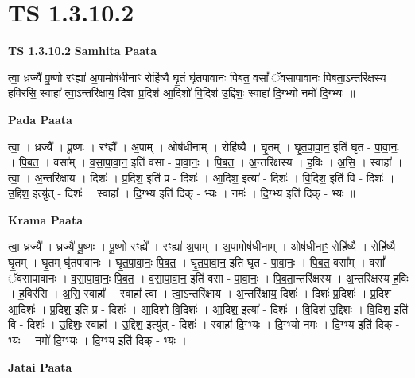 \documentclass[17pt]{extarticle}
\begin{document}
\section{ TS 1.3.10.2 }

\textbf{TS 1.3.10.2 } \newline
\textbf{Samhita Paata} \newline

त्वा॒ ध्रज्यै॑ पू॒ष्णो रꣳह्या॑ अ॒पामोष॑धीनाꣳ॒॒ रोहि॑ष्यै घृ॒तं घृ॑तपावानः पिबत॒ वसां᳚ ॅवसापावानः पिबता॒ऽन्तरि॑क्षस्य ह॒विर॑सि॒ स्वाहा᳚ त्वा॒ऽन्तरि॑क्षाय॒ दिशः॑ प्र॒दिश॑ आ॒दिशो॑ वि॒दिश॑ उ॒द्दिशः॒ स्वाहा॑ दि॒ग्भ्यो नमो॑ दि॒ग्भ्यः ॥ \newline

\textbf{Pada Paata} \newline

त्वा॒ । ध्रज्यै᳚ । पू॒ष्णः । रꣳह्यै᳚ । अ॒पाम् । ओष॑धीनाम् । रोहि॑ष्यै । घृ॒तम् । घृ॒त॒पा॒वा॒न॒ इति॑ घृत - पा॒वा॒नः॒ । पि॒ब॒त॒ । वसा᳚म् । व॒सा॒पा॒वा॒न॒ इति॑ वसा - पा॒वा॒नः॒ । पि॒ब॒त॒ । अ॒न्तरि॑क्षस्य । ह॒विः । अ॒सि॒ । स्वाहा᳚ । त्वा॒ । अ॒न्तरि॑क्षाय । दिशः॑ । प्र॒दिश॒ इति॑ प्र - दिशः॑ । आ॒दिश॒ इत्या᳚ - दिशः॑ । वि॒दिश॒ इति॑ वि - दिशः॑ । उ॒द्दिश॒ इत्यु॑त् - दिशः॑ । स्वाहा᳚ । दि॒ग्भ्य इति॑ दिक् - भ्यः । नमः॑ । दि॒ग्भ्य इति॑ दिक् - भ्यः ॥  \newline


\textbf{Krama Paata} \newline

त्वा॒ ध्रज्यै᳚ । ध्रज्यै॑ पू॒ष्णः । पू॒ष्णो रꣳह्ये᳚ । रꣳह्या॑ अ॒पाम् । अ॒पामोष॑धीनाम् । ओष॑धीनाꣳ॒॒ रोहि॑ष्यै । रोहि॑ष्यै घृ॒तम् । घृ॒तम् घृ॑तपावानः । घृ॒त॒पा॒वा॒नः॒ पि॒ब॒त॒ । घृ॒त॒पा॒वा॒न॒ इति॑ घृत - पा॒वा॒नः॒ । पि॒ब॒त॒ वसा᳚म् । वसां᳚ ॅवसापावानः । व॒सा॒पा॒वा॒नः॒ पि॒ब॒त॒ । व॒सा॒पा॒वा॒न॒ इति॑ वसा - पा॒वा॒नः॒ । पि॒ब॒ता॒न्तरि॑क्षस्य । अ॒न्तरि॑क्षस्य ह॒विः । ह॒विर॑सि । अ॒सि॒ स्वाहा᳚ । स्वाहा᳚ त्वा । त्वा॒ऽन्तरि॑क्षाय । अ॒न्तरि॑क्षाय॒ दिशः॑ । दिशः॑ प्र॒दिशः॑ । प्र॒दिश॑ आ॒दिशः॑ । प्र॒दिश॒ इति॑ प्र - दिशः॑ । आ॒दिशो॑ वि॒दिशः॑ । आ॒दिश॒ इत्या᳚ - दिशः॑ । वि॒दिश॑ उ॒द्दिशः॑ । वि॒दिश॒ इति॑ वि - दिशः॑ । उ॒द्दिशः॒ स्वाहा᳚ । उ॒द्दिश॒ इत्यु॑त् - दिशः॑ । स्वाहा॑ दि॒ग्भ्यः । दि॒ग्भ्यो नमः॑ । दि॒ग्भ्य इति॑ दिक् - भ्यः । नमो॑ दि॒ग्भ्यः । दि॒ग्भ्य इति॑ दिक् - भ्यः । \newline

\textbf{Jatai Paata} \newline
\end{document}
